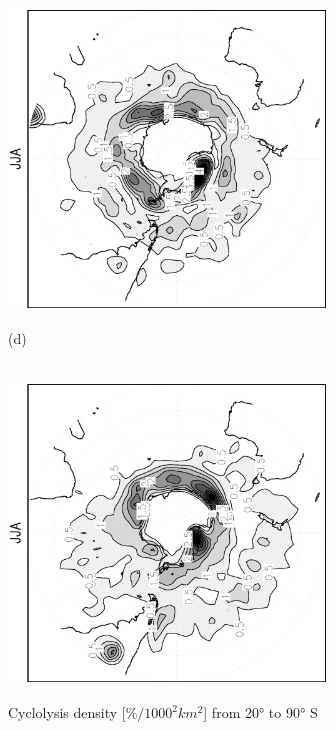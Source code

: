 \documentclass[12pt,a4paper,twoside,openright,headinclude,liststotoc,bibtotoc]{scrreprt}
\begin{document}
\begin{appendix}
\begin{figure}[b]
{\includegraphics[height=8.0cm,angle=-90]
{eps/cycllys_PLASIM_T21_45JJA_SH.eps}
}
\parbox{8.5cm}{\hspace{0.95cm}\begin{scriptsize}(d)\end{scriptsize} \vspace{-0.5cm} \\
\includegraphics[height=8.0cm,angle=-90]
{eps/cycllys_ERA40_T21_45JJA_SH.eps}
}
\caption[Cyclolysis density Southern Hemisphere]{Cyclolysis density [$\%/1000^2 km^2$] from 20° to 90° S}
\label{img:SHcycllys}
\end{figure}

\end{appendix}
\end{document}

